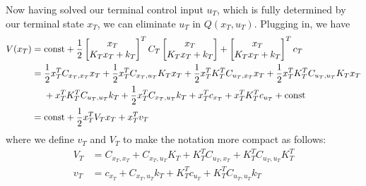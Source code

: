 Now having solved our terminal control input $u_T$, which is fully determined by our terminal state $x_T$, we can eliminate $u_T$ in $Q(x_T,u_T).$ Plugging in, we have
\begin{align*}
V(x_T) &= \mathrm{const} + \frac{1}{2}\begin{bmatrix}x_T\\K_Tx_T+k_T\end{bmatrix}^TC_T\begin{bmatrix}x_T\\K_Tx_T+k_T\end{bmatrix}+\begin{bmatrix}x_T\\K_Tx_T+k_T\end{bmatrix}^Tc_T\\
&=\frac{1}{2}x_T^TC_{x_T,x_T}x_T + \frac{1}{2}x_T^TC_{x_T,u_T}K_Tx_T+ \frac{1}{2}x_T^TK_T^TC_{u_T,x_T}x_T + \frac{1}{2}x_T^TK_T^TC_{u_T,u_T}K_Tx_T\\& \phantomrel{=} {}  + x_T^TK_T^TC_{u_T,u_T}k_T + \frac{1}{2}x_T^TC_{x_T,u_T}k_T + x_T^Tc_{x_T} + x_T^TK_T^Tc_{u_T} + \mathrm{const}\\
&= \text{const} + \frac{1}{2}x_T^TV_Tx_T + x_T^Tv_T
\end{align*}
where we define $v_T$ and $V_T$ to make the notation more compact as follows:
\begin{align*}
    V_T &= C_{x_T,x_T} + C_{x_T,u_T}K_T +K_T^TC_{u_T,x_T} + K_T^TC_{u_T,u_T}K_T^T\\
    v_T&= c_{x_T} + C_{x_T,u_T}k_T+K_T^Tc_{u_T} + K_T^TC_{u_T,u_T}k_T
\end{align*}

